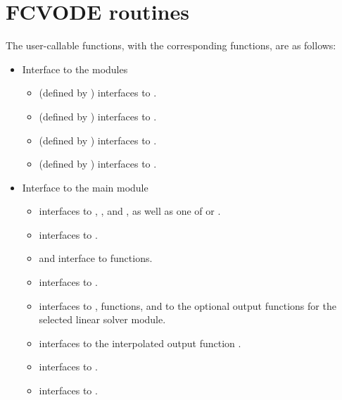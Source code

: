 \section{FCVODE routines}\label{sss:fcvroutines}

The user-callable functions, with the corresponding {\cvode} functions,
are as follows:
\begin{itemize}
\item
  Interface to the {\nvector} modules
  \begin{itemize}
  \item {} (defined by {\nvecs}) 
    interfaces to .
  \item {} (defined by {\nvecp}) 
    interfaces to .
  \item {} (defined by {\nvecopenmp}) 
    interfaces to .
  \item {} (defined by {\nvecpthreads}) 
    interfaces to .
  \end{itemize}
\item Interface to the main {\cvode} module
  \begin{itemize}
  \item {}
    interfaces to , , and ,
    as well as one of  or .
  \item {}  
    interfaces to .
  \item {} and 
    interface to  functions.
  \item {}    
    interfaces to .
  \item {}
    interfaces to ,  functions, and to the optional
    output functions for the selected linear solver module.
  \item {}     
    interfaces to the interpolated output function .
  \item {}
    interfaces to .
  \item {}
    interfaces to .

\end{itemize}
\end{itemize}
